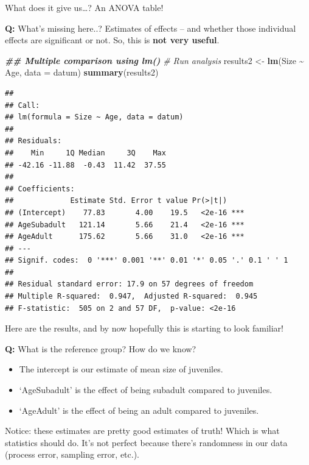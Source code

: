 \documentclass[
]{article}
\newenvironment{Shaded}{\begin{snugshade}}{\end{snugshade}}
\newcommand{\AttributeTok}[1]{\textcolor[rgb]{0.13,0.29,0.53}{#1}}
\newcommand{\CommentTok}[1]{\textcolor[rgb]{0.56,0.35,0.01}{\textit{#1}}}
\newcommand{\DocumentationTok}[1]{\textcolor[rgb]{0.56,0.35,0.01}{\textbf{\textit{#1}}}}
\newcommand{\FunctionTok}[1]{\textcolor[rgb]{0.13,0.29,0.53}{\textbf{#1}}}
\newcommand{\NormalTok}[1]{#1}
\newcommand{\OtherTok}[1]{\textcolor[rgb]{0.56,0.35,0.01}{#1}}
\newcommand{\SpecialCharTok}[1]{\textcolor[rgb]{0.81,0.36,0.00}{\textbf{#1}}}
\providecommand{\tightlist}{%
  \setlength{\itemsep}{0pt}\setlength{\parskip}{0pt}}
\begin{document}
What does it give us\ldots? An ANOVA table!

\textbf{Q:} What's missing here..? Estimates of effects -- and whether
those individual effects are significant or not. So, this is \textbf{not
very useful}.

\begin{Shaded}
\begin{Highlighting}[]
\DocumentationTok{\#\# Multiple comparison using \textquotesingle{}lm()\textquotesingle{}}
\CommentTok{\# Run analysis}
\NormalTok{results2 }\OtherTok{\textless{}{-}} \FunctionTok{lm}\NormalTok{(Size }\SpecialCharTok{\textasciitilde{}}\NormalTok{ Age, }\AttributeTok{data =}\NormalTok{ datum)}
\FunctionTok{summary}\NormalTok{(results2)}
\end{Highlighting}
\end{Shaded}

\begin{verbatim}
## 
## Call:
## lm(formula = Size ~ Age, data = datum)
## 
## Residuals:
##    Min     1Q Median     3Q    Max 
## -42.16 -11.88  -0.43  11.42  37.55 
## 
## Coefficients:
##             Estimate Std. Error t value Pr(>|t|)    
## (Intercept)    77.83       4.00    19.5   <2e-16 ***
## AgeSubadult   121.14       5.66    21.4   <2e-16 ***
## AgeAdult      175.62       5.66    31.0   <2e-16 ***
## ---
## Signif. codes:  0 '***' 0.001 '**' 0.01 '*' 0.05 '.' 0.1 ' ' 1
## 
## Residual standard error: 17.9 on 57 degrees of freedom
## Multiple R-squared:  0.947,  Adjusted R-squared:  0.945 
## F-statistic:  505 on 2 and 57 DF,  p-value: <2e-16
\end{verbatim}

Here are the results, and by now hopefully this is starting to look
familiar!

\textbf{Q:} What is the reference group? How do we know?

\begin{itemize}
\tightlist
\item
  The intercept is our estimate of mean size of juveniles.
\item
  `AgeSubadult' is the effect of being subadult compared to juveniles.
\item
  `AgeAdult' is the effect of being an adult compared to juveniles.
\end{itemize}

Notice: these estimates are pretty good estimates of truth! Which is
what statistics should do. It's not perfect because there's randomness
in our data (process error, sampling error, etc.).
\end{document}
